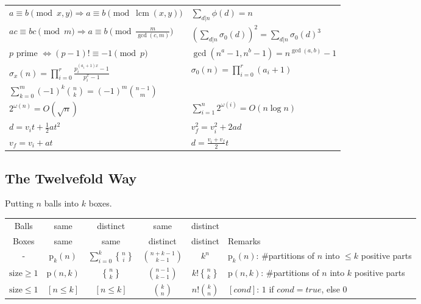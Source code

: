 \documentclass[8pt,a4paper,landscape,oneside]{amsart}
\DeclareMathOperator{\lcm}{lcm}
\DeclareRobustCommand{\stirling}{\genfrac\{\}{0pt}{}}
\begin{document}
\begin{multicols*}{3}
\begin{tabular}{ll}
        $a\equiv b\pmod{x,y} \Rightarrow a\equiv b\pmod{\lcm(x,y)}$ & $\sum_{d|n} \phi(d) = n$ \\
        $ac\equiv bc\pmod{m} \Rightarrow a\equiv b\pmod{\frac{m}{\gcd(c,m)}}$ & $(\sum_{d|n} \sigma_0(d))^2 = \sum_{d|n} \sigma_0(d)^3$ \\
        $p$ prime $\Leftrightarrow (p-1)!\equiv -1\pmod{p}$ & $\gcd(n^a-1,n^b-1) = n^{\gcd(a,b)}-1$ \\
        $\sigma_x(n) = \prod_{i=0}^{r} \frac{p_i^{(a_i + 1)x} - 1}{p_i^x - 1}$ & $\sigma_0(n) = \prod_{i=0}^r (a_i + 1)$ \\
        $\sum_{k=0}^m (-1)^k \binom{n}{k} = (-1)^m \binom{n-1}{m}$ & \\
        $2^{\omega(n)} = O(\sqrt{n})$ & $\sum_{i=1}^n 2^{\omega(i)} = O(n \log n)$ \\
        $d = v_i t + \frac{1}{2}at^2$ & $v_f^2 = v_i^2 + 2ad$ \\
        $v_f = v_i + at$ & $d = \frac{v_i + v_f}{2}t$ \\
    \end{tabular}
    \subsection{The Twelvefold Way}
        Putting $n$ balls into $k$ boxes.\\
    \begin{tabular}{@{}c|c|c|c|c|l@{}}
    Balls & same & distinct & same & distinct & \\
    Boxes & same & same & distinct & distinct & Remarks\\
    \hline
        - & $\mathrm{p}_k(n)$ & $\sum_{i=0}^k \stirling{n}{i}$ & $\binom{n+k-1}{k-1}$ & $k^n$ & $\mathrm{p}_k(n)$: \#partitions of $n$ into $\le k$ positive parts \\
        $\mathrm{size}\ge 1$ & $\mathrm{p}(n,k)$ & $\stirling{n}{k}$ & $\binom{n-1}{k-1}$ & $k!\stirling{n}{k}$ & $\mathrm{p}(n,k)$: \#partitions of $n$ into $k$ positive parts \\
        $\mathrm{size}\le 1$ & $[n \le k]$ & $[n \le k]$ & $\binom{k}{n}$ & $n!\binom{k}{n}$ & $[cond]$: $1$ if $cond=true$, else $0$\\
    \bottomrule
    \end{tabular}

\end{multicols*}
\end{document}
